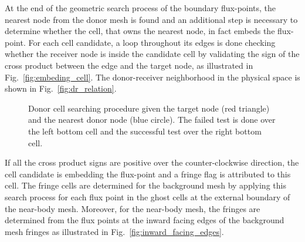 At the end of the geometric search process of the boundary flux-points, the nearest node from the donor mesh is found and an additional step is necessary to determine whether the cell, that owns the nearest node, in fact embeds the flux-point. For each cell candidate, a loop throughout its edges is done checking whether the receiver node is inside the candidate cell by validating the sign of the cross product between the edge and the target node, as illustrated in Fig.\ \ref{fig:embeding_cell}. The donor-receiver neighborhood in the physical space is shown in Fig.\ \ref{fig:dr_relation}.
%
\begin{figure}[H]
	\centering
    \caption{Donor cell searching procedure given the target node (red triangle) and the nearest donor node (blue circle). The failed test is done over the left bottom cell and the successful test over the right bottom cell.}
    \label{fig:geometric_search}
\end{figure}
%
If all the cross product signs are positive over the counter-clockwise direction, the cell candidate is embedding the flux-point and a fringe flag is attributed to this cell. The fringe cells are determined for the background mesh by applying this search process for each flux point in the ghost cells at the external boundary of the near-body mesh. Moreover, for the near-body mesh, the fringes are determined from the flux points at the inward facing edges of the background mesh fringes as illustrated in Fig.\ \ref{fig:inward_facing_edges}. 
